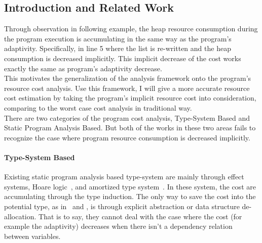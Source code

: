 \subsection{Introduction and Related Work}
\label{subsubsec:furthers-cost-backgroung}
Through observation in following example, the heap resource consumption during the program 
execution is accumulating in the same way as the program's adaptivity. Specifically, in line 5 
where the list is re-written and the heap consumption is decreased implicitly. 
This implicit decrease 
of the cost works exactly the same as program's adaptivity decrease.
\\
This motivates the generalization of the analysis framework onto the program's resource cost analysis. Use this framework,
I will give
a more accurate resource cost estimation by taking the program's implicit resource cost into consideration, comparing 
to the worst case cost analysis in traditional way.
\\
There are two categories of the program cost analysis, Type-System Based and Static Program Analysis Based. But both of the
works in these two areas fails to recognize the case where program resource consumption is decreased implicitly.
\paragraph*{Type-System Based}
Existing
static program analysis based type-system are mainly through 
effect systems, 
Hoare logic~\cite{gaboardi2021graded}, and amortized type system~\cite{hoffmann_jost_2022}.
%
In these system, the cost are accumulating through the type induction. The only way to save the cost into the potential
type, as in~\cite{GustafssonEL05} and \cite{hoffmann_jost_2022}, is through explicit abstraction or data structure de-allocation.
That is to say, they cannot deal with the case where the cost (for example the adaptivity) decreases when there isn't a dependency relation between variables.
